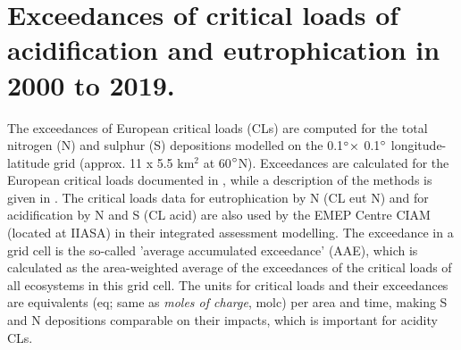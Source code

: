 

\clearpage
\section{Exceedances of critical loads of acidification and eutrophication in 2000 to 2019.}
\label{subs:exceedSnN}

The exceedances of European critical loads (CLs) are computed for the total nitrogen
(N) and sulphur (S) depositions modelled on the 0.1$^\circ \times$ 0.1$^\circ$
longitude-latitude grid (approx. 11 x 5.5 km$^{2}$ at 60$^\circ$N).
Exceedances are calculated for the European critical loads documented in \cite{Hettelingh:2017}, while
a description of the methods is given in \cite{DeVries:2015}. The
critical loads data for eutrophication by N (CL eut N) and for acidification by N and S
(CL acid) are also used by the EMEP Centre CIAM (located at IIASA) in their integrated assessment
modelling. The exceedance in a grid cell is the so-called ’average accumulated
exceedance’ (AAE), which is calculated as the area-weighted average of the
exceedances of the critical loads of all ecosystems in this grid cell. The units for
critical loads and their exceedances are equivalents (eq; same as \textit{moles of charge},
molc) per area and time, making S and N depositions comparable on their impacts, which is important for
acidity CLs.

